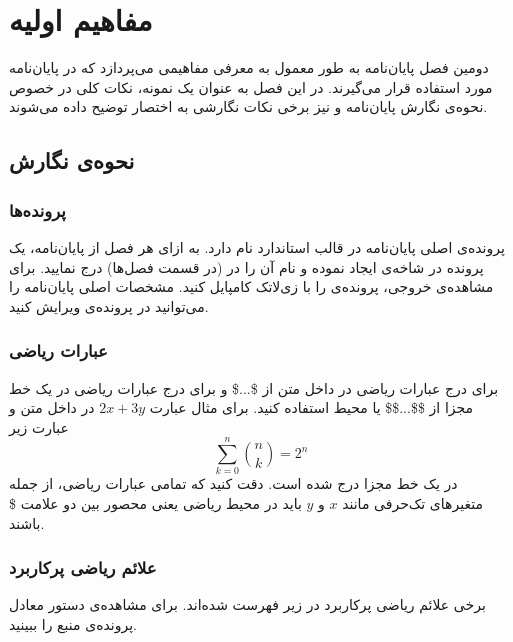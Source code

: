 
\chapter{مفاهیم اولیه}


دومین فصل پایان‌نامه به طور معمول به معرفی مفاهیمی می‌پردازد که در پایان‌نامه مورد استفاده قرار می‌گیرند.
در این فصل به عنوان یک نمونه، نکات کلی در خصوص نحوه‌ی نگارش پایان‌نامه
و نیز برخی نکات نگارشی به اختصار توضیح داده می‌شوند.

\section{نحوه‌ی نگارش}

\subsection{پرونده‌ها}

پرونده‌ی اصلی پایان‌نامه در قالب استاندارد
  نام دارد.
به ازای هر فصل از پایان‌نامه، یک پرونده در شاخه‌ی  ایجاد نموده
و نام آن را در   (در قسمت فصل‌ها) درج نمایید.
برای مشاهده‌ی خروجی، پرونده‌ی  را با زی‌لاتک کامپایل کنید.
مشخصات اصلی پایان‌نامه را می‌توانید در پرونده‌ی  ویرایش کنید.

\subsection{عبارات ریاضی}

برای درج عبارات ریاضی در داخل متن از \$...\$ و 
برای درج عبارات ریاضی در یک خط مجزا از \$\$...\$\$ یا محیط  
استفاده کنید. برای مثال عبارت 
$2x + 3y$
در داخل متن و عبارت زیر
\begin{equation}
\sum_{k=0}^{n} \binom{n}{k} = 2^n
\end{equation}
در یک خط مجزا درج شده است. 
دقت کنید که تمامی عبارات ریاضی، از جمله متغیرهای تک‌حرفی مانند $x$ و $y$ باید در محیط ریاضی 
یعنی محصور بین دو علامت \$ باشند. 


\subsection{علائم ریاضی پرکاربرد}

برخی علائم ریاضی پرکاربرد در زیر فهرست شده‌اند. 
برای مشاهده‌ی دستور  معادل پرونده‌ی منبع را ببینید.


